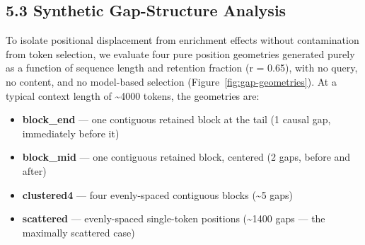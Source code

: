 \documentclass[10pt,letterpaper]{article}
\providecommand{\tightlist}{%
  \setlength{\itemsep}{0pt}\setlength{\parskip}{0pt}}
\begin{document}
\hypertarget{synthetic-gap-structure-analysis}{%
\subsection{5.3 Synthetic Gap-Structure
Analysis}\label{synthetic-gap-structure-analysis}}

To isolate positional displacement from enrichment effects without
contamination from token selection, we evaluate four pure position
geometries generated purely as a function of sequence length and
retention fraction (r = 0.65), with no query, no content, and no
model-based selection (Figure~\ref{fig:gap-geometries}). At a typical
context length of \textasciitilde4000 tokens, the geometries are:

\begin{itemize}
\tightlist
\item
  \textbf{block\_end} --- one contiguous retained block at the tail (1
  causal gap, immediately before it)
\item
  \textbf{block\_mid} --- one contiguous retained block, centered (2
  gaps, before and after)
\item
  \textbf{clustered4} --- four evenly-spaced contiguous blocks
  (\textasciitilde5 gaps)
\item
  \textbf{scattered} --- evenly-spaced single-token positions
  (\textasciitilde1400 gaps --- the maximally scattered case)
\end{itemize}
\end{document}

